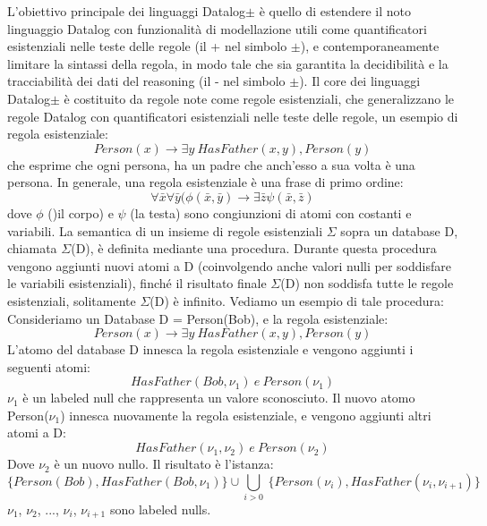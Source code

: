 L'obiettivo principale dei linguaggi Datalog$\pm$ è quello di estendere il noto linguaggio Datalog con funzionalità di modellazione utili come quantificatori esistenziali nelle teste delle regole (il + nel simbolo $\pm $), e contemporaneamente limitare la sintassi della regola, in modo tale che sia garantita la decidibilità e la tracciabilità dei dati del reasoning (il - nel simbolo $\pm $). \newline
Il core dei linguaggi Datalog$\pm $ è costituito da regole note come regole esistenziali, che generalizzano le regole Datalog con quantificatori esistenziali nelle teste delle regole, un esempio di regola esistenziale: \[Person(x) \rightarrow \exists y ~HasFather(x,y), Person(y)\]
che esprime che ogni persona, ha un padre che anch'esso a sua volta è una persona. \newline
In generale, una regola esistenziale è una frase di primo ordine: \[\forall \bar{x} \forall \bar{y} (\phi(\bar{x}, \bar{y}) \rightarrow \exists \bar{z} \psi (\bar{x}, \bar{z})\]
dove $\phi$  ()il corpo) e $\psi$  (la testa) sono congiunzioni di atomi con costanti e variabili. \newline
La semantica di un insieme di regole esistenziali $\Sigma$ sopra un database D, chiamata $\Sigma$(D), è definita mediante una procedura. Durante questa procedura vengono aggiunti nuovi atomi a D (coinvolgendo anche valori nulli per soddisfare le variabili esistenziali), finché il risultato finale $\Sigma$(D) non soddisfa tutte le regole esistenziali, solitamente $\Sigma$(D) è infinito. \newline
Vediamo un esempio di tale procedura: \newline
Consideriamo un Database D = {Person(Bob)}, e la regola esistenziale: \[Person(x) \rightarrow \exists y ~HasFather(x,y), Person(y)\]
L'atomo del database D innesca la regola esistenziale e vengono aggiunti i seguenti atomi: \[HasFather(Bob, \nu_{1}) ~e~ Person(\nu_{1})\]
$\nu_{1}$ è un labeled null che rappresenta un valore sconosciuto.\newline
Il nuovo atomo Person($\nu_{1}$) innesca nuovamente la regola esistenziale, e vengono aggiunti altri atomi a D: \[HasFather(\nu_{1}, \nu_{2}) ~e~ Person(\nu_{2})\]
Dove $\nu_{2}$ è un nuovo nullo. Il risultato è l'istanza: \[\{Person(Bob), HasFather(Bob, \nu_{1})\} \cup \underset{i>0}{\bigcup} ~\{Person(\nu_{i}), HasFather(\nu_{i}, \nu_{i+1})\}\]
$\nu_{1}$, $\nu_{2}$, ..., $\nu_{i}$, $\nu_{i+1}$ sono labeled nulls. \newline \newline
